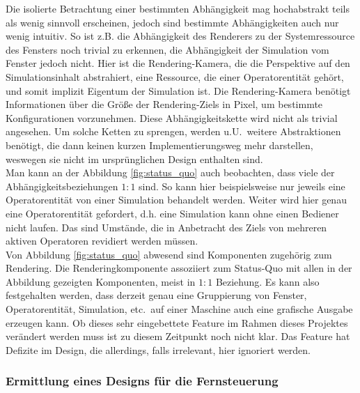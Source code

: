 Die isolierte Betrachtung einer bestimmten Abhängigkeit mag hochabstrakt teils als wenig sinnvoll erscheinen, jedoch sind bestimmte Abhängigkeiten auch nur wenig intuitiv. So ist z.B. die Abhängigkeit des Renderers zu der Systemressource des Fensters noch trivial zu erkennen, die Abhängigkeit der Simulation vom Fenster jedoch nicht. Hier ist die Rendering-Kamera, die die Perspektive auf den Simulationsinhalt abstrahiert, eine Ressource, die einer Operatorentität gehört, und somit implizit Eigentum der Simulation ist. Die Rendering-Kamera benötigt Informationen über die Größe der Rendering-Ziels in Pixel, um bestimmte Konfigurationen vorzunehmen. Diese Abhängigkeitskette wird nicht als trivial angesehen. Um solche Ketten zu sprengen, werden u.U.~weitere Abstraktionen benötigt, die dann keinen kurzen Implementierungsweg mehr darstellen, weswegen sie nicht im ursprünglichen Design enthalten sind.\\

Man kann an der Abbildung \ref{fig:status_quo} auch beobachten, dass viele der Abhängigkeitsbeziehungen $1:1$ sind. So kann hier beispielsweise nur jeweils eine Operatorentität von einer Simulation behandelt werden.  Weiter wird hier genau eine Operatorentität gefordert, d.h. eine Simulation kann ohne einen Bediener nicht laufen. Das sind Umstände, die in Anbetracht des Ziels von mehreren aktiven Operatoren revidiert werden müssen.\\
Von Abbildung \ref{fig:status_quo} abwesend sind Komponenten zugehörig zum Rendering. Die Renderingkomponente assoziiert zum Status-Quo mit allen in der Abbildung gezeigten Komponenten, meist in $1:1$ Beziehung. Es kann also festgehalten werden, dass derzeit genau eine Gruppierung von Fenster, Operatorentität, Simulation, etc.~auf einer Maschine  auch eine grafische Ausgabe erzeugen kann. Ob dieses sehr eingebettete Feature im Rahmen dieses Projektes verändert werden muss ist zu diesem Zeitpunkt noch nicht klar. Das Feature hat Defizite im Design, die allerdings, falls irrelevant, hier ignoriert werden.


\subsubsection{Ermittlung eines Designs für die Fernsteuerung}

